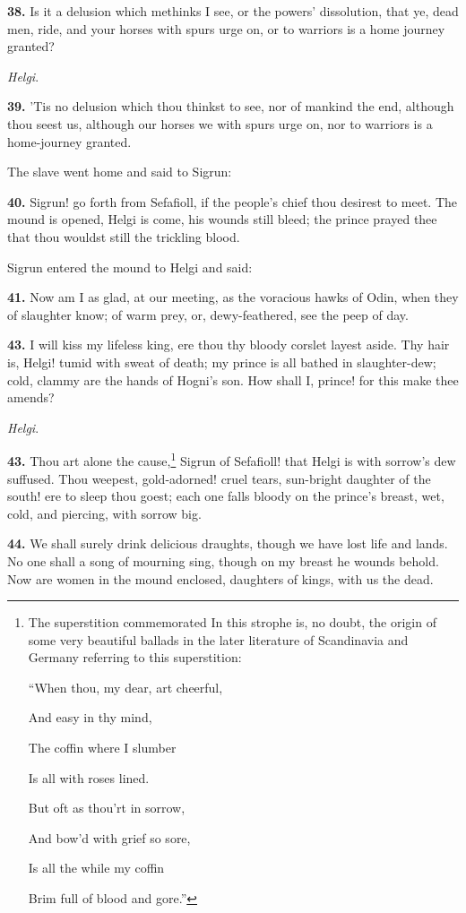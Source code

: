 \textbf{38.} Is it a delusion which methinks I see, or the powers'
dissolution, that ye, dead men, ride, and your horses with spurs urge
on, or to warriors is a home journey granted?

\emph{Helgi}.

\textbf{39.} 'Tis no delusion which thou thinkst to see, nor of mankind the
end, although thou seest us, although our horses we with spurs urge
on, nor to warriors is a home-journey granted.

The slave went home and said to Sigrun:

\textbf{40.} Sigrun! go forth from Sefafioll, if the people's chief thou
desirest to meet. The mound is opened, Helgi is come, his wounds still
bleed; the prince prayed thee that thou wouldst still the trickling
blood.

Sigrun entered the mound to Helgi and said:

\textbf{41.} Now am I as glad, at our meeting, as the voracious hawks of
Odin, when they of slaughter know; of warm prey, or, dewy-feathered,
see the peep of day.

\textbf{43.} I will kiss my lifeless king, ere thou thy bloody corslet layest
aside. Thy hair is, Helgi! tumid with sweat of death; my prince is all
bathed in slaughter-dew; cold, clammy are the hands of Hogni's son.
How shall I, prince! for this make thee amends?

\emph{Helgi}.

\textbf{43.} Thou art alone the cause,\footnote{The superstition commemorated In this strophe is, no
doubt, the origin of some very beautiful ballads in the later
literature of Scandinavia and Germany referring to this superstition:

``When thou, my dear, art cheerful,

And easy in thy mind,

The coffin where I slumber

Is all with roses lined.

But oft as thou'rt in sorrow,

And bow'd with grief so sore,

Is all the while my coffin

Brim full of blood and gore.''} Sigrun of Sefafioll! that Helgi is
with sorrow's dew suffused. Thou weepest, gold-adorned! cruel tears,
sun-bright daughter of the south! ere to sleep thou goest; each one
falls bloody on the prince's breast, wet, cold, and piercing, with
sorrow big.

\textbf{44.} We shall surely drink delicious draughts, though we have lost
life and lands. No one shall a song of mourning sing, though on my
breast he wounds behold. Now are women in the mound enclosed,
daughters of kings, with us the dead.

